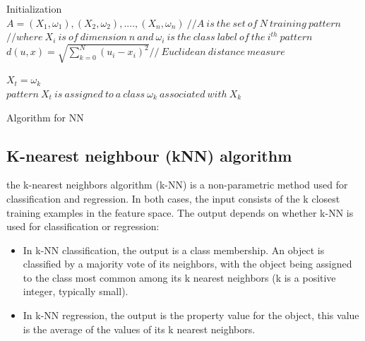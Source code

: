 \begin{algorithm}[H]
\SetAlgoLined

 Initialization\;
 $ A=(X_{1},\omega_{1}),(X_{2},\omega_{2}),....,(X_{n},\omega_{n}) \ // A\ is\ the\ set\ of\ N\ training\ pattern $\\
 
 
$ //where\  X_{i}\ is\ of\ dimension\ n\ and\  \omega_{i}\ is\ the\ class\ label\ of\ the\ i^{th}\ pattern $\\
 
 
 $d(u,x) = \sqrt{\sum_{k=0}^{N} (u_{i}-x_{i})^{2}}  // \ Euclidean\ distance\ measure $\\ 

 
 $ X_{t} = \omega_{k} $ \\
 
 $ pattern\ X_{t}\ is\ assigned\ to\ a\ class\ \omega_{k}\ associated\ with\  X_{k} $
 
 \caption{Algorithm for NN}
\end{algorithm}



\subsection{K-nearest neighbour (kNN) algorithm}
 the k-nearest neighbors algorithm (k-NN) is a non-parametric method used for classification and regression.  In both cases, the input consists of the k closest training examples in the feature space. The output depends on whether k-NN is used for classification or regression:
\begin{itemize}
\item In k-NN classification, the output is a class membership. An object is classified by a majority vote of its neighbors, with the object being assigned to the class most common among its k nearest neighbors (k is a positive integer, typically small). 
\item In k-NN regression, the output is the property value for the object, this value is the average of the values of its k nearest neighbors.
\end{itemize}


